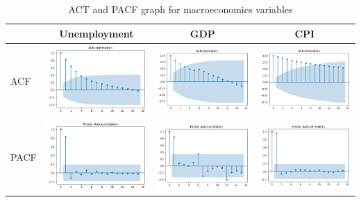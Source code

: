 \documentclass[11pt,a4paper]{article}
\begin{document}
\begin{table}
\begin{center}
\begin{tabular}{|l|c|c|c|}
\hline
  & Unemployment & GDP & CPI\\
\hline\hline
ACF & \includegraphics[width=40mm,scale=0.5]{images/ACF1.png} & \includegraphics[width=40mm,scale=0.5]{images/ACF2.png} & \includegraphics[width=40mm,scale=0.5]{images/ACF3.png}\\
\hline
PACF & \includegraphics[width=40mm,scale=0.5]{images/PACF1.png} & \includegraphics[width=40mm,scale=0.5]{images/PACF2.png}& \includegraphics[width=40mm,scale=0.5]{images/PACF3.png}\\
\hline
\end{tabular}
\end{center}
\caption{ACT and PACF graph for macroeconomics variables}
\label{tab:acf_pacf}
\end{table}
\end{document}
